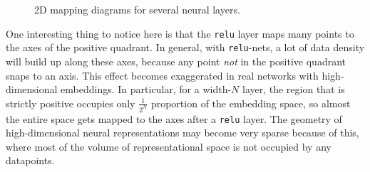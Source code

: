\begin{figure}[h]
{\begin{minipage}{0.28\textwidth}
\end{minipage}
}
\caption{2D mapping diagrams for several neural layers.}
\label{fig:neural_nets_as_data_transformations:2D_mapping_diagrams}
\end{figure}



One interesting thing to notice here is that the \texttt{relu} layer maps many points to the axes of the positive quadrant. In general, with \texttt{relu}-nets, a lot of data density will build up along these axes, because any point \textit{not} in the positive quadrant snaps to an axis. This effect becomes exaggerated in real networks with high-dimensional embeddings. In particular, for a width-$N$ layer, the region that is strictly positive occupies only $\frac{1}{2^N}$ proportion of the embedding space, so almost the entire space gets mapped to the axes after a \texttt{relu} layer. The geometry of high-dimensional neural representations may become very sparse because of this, where most of the volume of representational space is not occupied by any datapoints.


